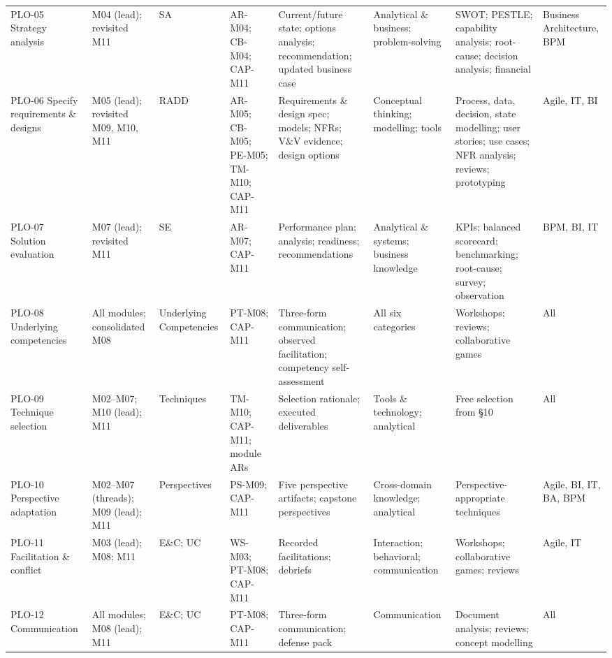 \documentclass[11pt,letterpaper,oneside]{report}
\begin{document}
\begin{landscape}
\begin{longtable}{@{}R{2.40cm} R{2.50cm} R{1.85cm} R{2.30cm} R{3.05cm} R{2.30cm} R{3.10cm} R{2.40cm}@{}}
PLO-05 Strategy analysis
  & M04 (lead); revisited M11
  & SA
  & AR-M04; CB-M04; CAP-M11
  & Current/future state; options analysis; recommendation; updated business case
  & Analytical \& business; problem-solving
  & SWOT; PESTLE; capability analysis; root-cause; decision analysis; financial
  & Business Architecture, BPM \\

PLO-06 Specify requirements \& designs
  & M05 (lead); revisited M09, M10, M11
  & RADD
  & AR-M05; CB-M05; PE-M05; TM-M10; CAP-M11
  & Requirements \& design spec; models; NFRs; V\&V evidence; design options
  & Conceptual thinking; modelling; tools
  & Process, data, decision, state modelling; user stories; use cases; NFR analysis; reviews; prototyping
  & Agile, IT, BI \\

PLO-07 Solution evaluation
  & M07 (lead); revisited M11
  & SE
  & AR-M07; CAP-M11
  & Performance plan; analysis; readiness; recommendations
  & Analytical \& systems; business knowledge
  & KPIs; balanced scorecard; benchmarking; root-cause; survey; observation
  & BPM, BI, IT \\

PLO-08 Underlying competencies
  & All modules; consolidated M08
  & Underlying Competencies
  & PT-M08; CAP-M11
  & Three-form communication; observed facilitation; competency self-assessment
  & All six categories
  & Workshops; reviews; collaborative games
  & All \\

PLO-09 Technique selection
  & M02--M07; M10 (lead); M11
  & Techniques
  & TM-M10; CAP-M11; module ARs
  & Selection rationale; executed deliverables
  & Tools \& technology; analytical
  & Free selection from \S10
  & All \\

PLO-10 Perspective adaptation
  & M02--M07 (threads); M09 (lead); M11
  & Perspectives
  & PS-M09; CAP-M11
  & Five perspective artifacts; capstone perspectives
  & Cross-domain knowledge; analytical
  & Perspective-appropriate techniques
  & Agile, BI, IT, BA, BPM \\

PLO-11 Facilitation \& conflict
  & M03 (lead); M08; M11
  & E\&C; UC
  & WS-M03; PT-M08; CAP-M11
  & Recorded facilitations; debriefs
  & Interaction; behavioral; communication
  & Workshops; collaborative games; reviews
  & Agile, IT \\

PLO-12 Communication
  & All modules; M08 (lead); M11
  & E\&C; UC
  & PT-M08; CAP-M11
  & Three-form communication; defense pack
  & Communication
  & Document analysis; reviews; concept modelling
  & All \\


\end{longtable}
\end{landscape}
\end{document}
